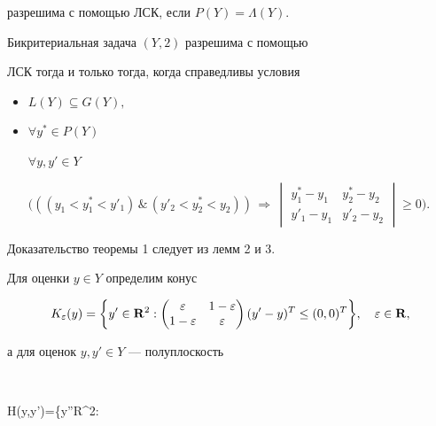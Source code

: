 разрешима с помощью ЛСК, если $P(Y)=\Lambda(Y)$. 


 


\begin{thm} Бикритериальная задача $(Y,2)$ разрешима с помощью 


ЛСК тогда и только тогда, когда справедливы условия 


\begin{itemize} 


\item[(i)] $L(Y)\subseteq G(Y),$ 


\item[(ii)] $\forall y^*\in P(Y)$  


$\forall y,y'\in Y$


$\Big(((y_1<y^*_1<y'_1)\,\&\,(y'_2<y^*_2<y_2))\, 


\Longrightarrow\,\begin{vmatrix} 


y^*_1-y_1 & y^*_2-y_2 \\ y'_1-y_1 & y'_2-y_2 


\end{vmatrix}\ge 0\Big)$.


\end{itemize} 


\end{thm}


 


Доказательство теоремы 1 следует из лемм 2 и 3. 


 


Для оценки $y\in Y$ определим конус 


$$ 


K_\varepsilon(y)=\bigg\{y'\in\bold R^2: 


\begin{pmatrix} 


\varepsilon & 1-\varepsilon \\ 1-\varepsilon & \varepsilon 


\end{pmatrix} 


(y'-y)^T\le(0,0)^T\bigg\},\quad \varepsilon\in \bold R, 


$$ 


а для оценок $y,y'\in Y$ --- полуплоскость 


$$ 


H(y,y')=\bigg\{y''\in\bold R^2: 


